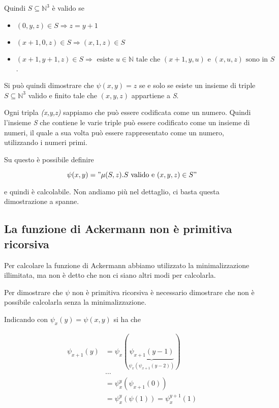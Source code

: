 Quindi $S \subseteq \mathbb{N}^{3}$ è valido se

\begin{itemize}
\item
  $ (0,y,z) \in S \Rightarrow z=y+1 $
\item
  $ (x+1, 0, z) \in S \Rightarrow (x, 1, z) \in S $
\item
  $ (x+1, y+1, z) \in S \Rightarrow \text{ esiste } u \in \mathbb{N} \text{ tale che } (x+1,y, u) \text{ e } (x,u,z) \text{ sono in } S $.
\end{itemize}

Si può quindi dimostrare che $\psi(x,y) = z$ se e solo se esiste un insieme di triple $S \subseteq \mathbb{N}^3$ valido e finito tale che $ (x,y,z) $ appartiene a \textit{S}.

Ogni tripla \emph{(x,y,z)} sappiamo che può essere codificata come un numero. 
Quindi l'insieme \emph{S} che contiene le varie triple può essere codificato come un insieme di numeri, il quale a sua volta può essere rappresentato come un numero, utilizzando i numeri primi.

Su questo è possibile definire

$$
\psi(x,y) = " \mu (S,z). S \text{ valido e }(x,y,z) \in S "
$$

e quindi è calcolabile. 
Non andiamo più nel dettaglio, ci basta questa dimostrazione a spanne.

\subsection{La funzione di Ackermann non è primitiva ricorsiva}

Per calcolare la funzione di Ackermann abbiamo utilizzato la minimalizzazione illimitata, ma non è detto che non ci siano altri modi per calcolarla.

Per dimostrare che $ \psi $ non è primitiva ricorsiva è necessario dimostrare che non è possibile calcolarla senza la minimalizzazione.

Indicando con $ \psi_x(y) = \psi(x,y) $ si ha che

\begin{align*}
\psi_{x+1}(y) &= \psi_x(\underbrace{\psi_{x+1}(y-1)}_{\psi_x(\psi_{x+1}(y-2))}) \\
						&\ldots \\
						&= \psi_{x}^y (\psi_{x+1}(0)) \\
						&= \psi_{x}^y(\psi(1)) = \psi_{x}^{y+1}(1)
\end{align*}

